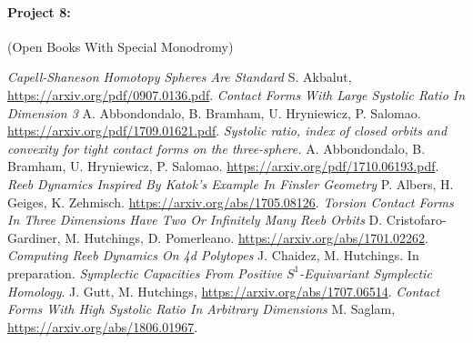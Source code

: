\documentclass[12pt]{article}
\numberwithin{equation}{section}
\theoremstyle{definition}
\begin{document}
\paragraph{Project 8:} (Open Books With Special Monodromy) 

\begin{thebibliography}{100}
 \emph{Capell-Shaneson Homotopy Spheres Are Standard} S. Akbalut, \url{https://arxiv.org/pdf/0907.0136.pdf}.
 \emph{Contact Forms With Large Systolic Ratio In Dimension 3} A. Abbondondalo, B. Bramham, U. Hryniewicz, P. Salomao. \url{https://arxiv.org/pdf/1709.01621.pdf}.
 \emph{Systolic ratio, index of closed orbits and convexity for tight contact forms on the three-sphere.} A. Abbondondalo, B. Bramham, U. Hryniewicz, P. Salomao. \url{https://arxiv.org/pdf/1710.06193.pdf}.
 \emph{Reeb Dynamics Inspired By Katok's Example In Finsler Geometry} P. Albers, H. Geiges, K. Zehmisch. \url{https://arxiv.org/abs/1705.08126}.
 \emph{Torsion Contact Forms In Three Dimensions Have Two Or Infinitely Many Reeb Orbits} D. Cristofaro-Gardiner, M. Hutchings, D. Pomerleano. \url{https://arxiv.org/abs/1701.02262}.
 \emph{Computing Reeb Dynamics On 4d Polytopes} J. Chaidez, M. Hutchings. In preparation.
 \emph{Symplectic Capacities From Positive $S^1$-Equivariant Symplectic Homology}. J. Gutt, M. Hutchings, \url{https://arxiv.org/abs/1707.06514}.
 \emph{Contact Forms With High Systolic Ratio In Arbitrary Dimensions} M. Saglam, \url{https://arxiv.org/abs/1806.01967}.
\end{thebibliography}
\end{document}
